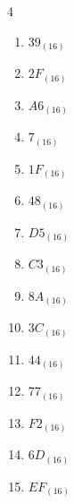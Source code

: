 \begin{multicols}{4}
\begin{enumerate}
        \phantom{$=202$}

  \item $39_{(16)}$

        \phantom{$=57$}

  \item $2F_{(16)}$

        \phantom{$=47$}

  \item $A6_{(16)}$

        \phantom{$=166$}

  \item $7_{(16)}$

        \phantom{$=7$}

  \item $1F_{(16)}$

        \phantom{$=31$}

  \item $48_{(16)}$

        \phantom{$=72$}

  \item $D5_{(16)}$

        \phantom{$=213$}

  \item $C3_{(16)}$

        \phantom{$=195$}

  \item $8A_{(16)}$

        \phantom{$=138$}

  \item $3C_{(16)}$

        \phantom{$=60$}

  \item $44_{(16)}$

        \phantom{$=68$}

  \item $77_{(16)}$

        \phantom{$=119$}

  \item $F2_{(16)}$

        \phantom{$=242$}

\columnbreak %

\resetques

  \item $6D_{(16)}$

        \phantom{$=109$}

  \item $EF_{(16)}$


\end{enumerate}
\end{multicols}
